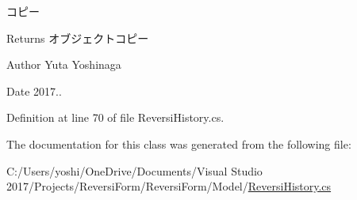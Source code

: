 コピー 

\begin{DoxyReturn}{Returns}
オブジェクトコピー 
\end{DoxyReturn}
\begin{DoxyAuthor}{Author}
Yuta Yoshinaga 
\end{DoxyAuthor}
\begin{DoxyDate}{Date}
2017.. 
\end{DoxyDate}


Definition at line 70 of file Reversi\+History.\+cs.



The documentation for this class was generated from the following file\+:\begin{DoxyCompactItemize}
\item 
C\+:/\+Users/yoshi/\+One\+Drive/\+Documents/\+Visual Studio 2017/\+Projects/\+Reversi\+Form/\+Reversi\+Form/\+Model/\hyperlink{_reversi_history_8cs}{Reversi\+History.\+cs}\end{DoxyCompactItemize}
